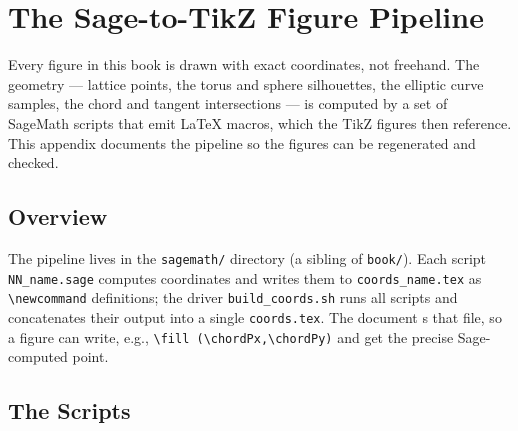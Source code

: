\chapter{The Sage-to-TikZ Figure Pipeline}
\label{app:C}

Every figure in this book is drawn with exact coordinates, not freehand. The
geometry --- lattice points, the torus and sphere silhouettes, the elliptic curve
samples, the chord and tangent intersections --- is computed by a set of SageMath
scripts that emit \LaTeX{} macros, which the TikZ figures then reference. This
appendix documents the pipeline so the figures can be regenerated and checked.

\section{Overview}
\label{sec:C-overview}

The pipeline lives in the \texttt{sagemath/} directory (a sibling of
\texttt{book/}). Each script \texttt{NN\_name.sage} computes coordinates and
writes them to \texttt{coords\_name.tex} as \verb|\newcommand| definitions; the
driver \texttt{build\_coords.sh} runs all scripts and concatenates their output
into a single \texttt{coords.tex}. The document \verb||s that file, so a
figure can write, e.g., \verb|\fill (\chordPx,\chordPy)| and get the precise
Sage-computed point.

\section{The Scripts}
\label{sec:C-scripts}

